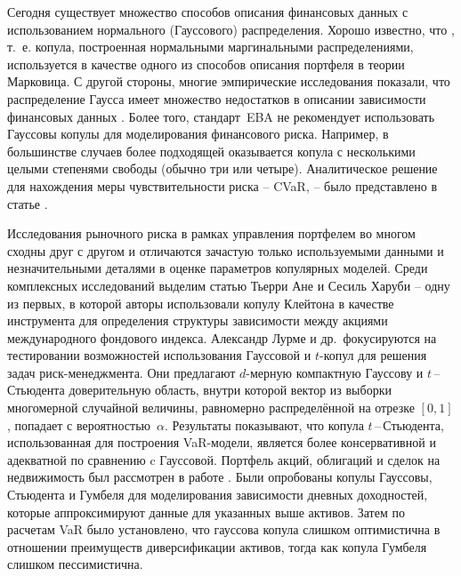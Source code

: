 Сегодня существует множество способов описания финансовых данных с использованием нормального (Гауссового) распределения. 
Хорошо известно, что , т.~е. копула, построенная нормальными маргинальными распределениями, используется в качестве одного из способов описания портфеля в теории Марковица. 
С другой стороны, многие эмпирические исследования показали, что распределение Гаусса имеет множество недостатков в описании зависимости финансовых данных \cite{Limp2011, Rachev2005, Wilmott2007}. 
Более того, стандарт~EBA \cite{EBA2015} не рекомендует использовать Гауссовы копулы для моделирования финансового риска. 
Например, в большинстве случаев более подходящей оказывается копула  с несколькими целыми степенями свободы (обычно три или четыре).
Аналитическое решение для нахождения меры чувствительности риска -- CVaR, -- было представлено в статье \cite{Stoyanov2013}.

Исследования \cite{Ane2003, Kole2007, Lourme2016, Xu2008} рыночного риска в рамках управления портфелем во многом сходны друг с другом и отличаются зачастую только используемыми данными и незначительными деталями в оценке параметров копулярных моделей. 
Среди комплексных исследований выделим статью Тьерри Ане и Сесиль Харуби \cite{Ane2003} -- одну из первых, в которой авторы использовали копулу Клейтона в качестве инструмента для определения структуры зависимости между акциями международного фондового индекса.
Александр Лурме и др.\,\cite{Lourme2016} фокусируются на тестировании возможностей использования Гауссовой и $t$-копул для решения задач риск-менеджмента. 
Они предлагают $d$-мерную компактную Гауссову и $t$\,--\,Стьюдента  доверительную область, внутри которой вектор из выборки многомерной случайной величины, равномерно распределённой на отрезке $[0, 1]$, попадает с вероятностью~$\alpha$.
Результаты показывают, что копула $t$\,--\,Стьюдента, использованная для построения VaR-модели, является более консервативной и адекватной по сравнению c Гауссовой.
Портфель акций, облигаций и сделок на недвижимость был рассмотрен в работе \cite{Kole2007}. %
Были опробованы копулы Гауссовы, Стьюдента и Гумбеля для моделирования зависимости дневных доходностей, которые аппроксимируют данные для указанных выше активов. 
Затем по расчетам VaR было установлено, что гауссова копула слишком оптимистична в отношении преимуществ диверсификации активов, тогда как копула Гумбеля слишком пессимистична.

